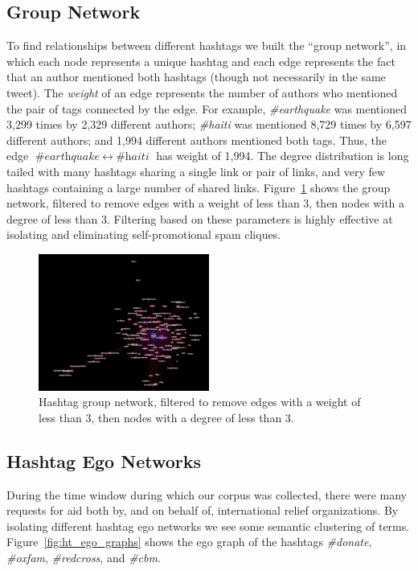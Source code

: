 \documentclass[a4paper, 11pt, titlepage]{article}
\begin{document}
\subsection{Group Network}

To find relationships between different hashtags we built the ``group network'', in which each node represents a unique hashtag and each edge represents the fact that an author mentioned both hashtags (though not necessarily in the same tweet). The \textit{weight} of an edge represents the number of authors who mentioned the pair of tags connected by the edge. For example, \textit{\#earthquake} was mentioned 3,299 times by 2,329 different authors; \textit{\#haiti} was mentioned 8,729 times by 6,597 different authors; and 1,994 different authors mentioned both tags. Thus, the edge $\textit{\#earthquake}~\leftrightarrow~\textit{\#haiti}$ has weight of 1,994. The degree distribution is long tailed with many hashtags sharing a single link or pair of links, and very few hashtags containing a large number of shared links. Figure~\ref{fig:ht_group_network} shows the group network, filtered to remove edges with a weight of less than 3, then nodes with a degree of less than 3. Filtering based on these parameters is highly effective at isolating and eliminating self-promotional spam cliques.

\begin{figure}[h]
\centering
\includegraphics[width=0.5\textwidth]{../figures/ht_group_network}
\caption{Hashtag group network, filtered to remove edges with a weight of less than 3, then nodes with a degree of less than 3. }
\label{fig:ht_group_network}
\end{figure}

\subsection{Hashtag Ego Networks}
During the time window during which our corpus was collected, there were many requests for aid both by, and on behalf of, international relief organizations. By isolating different hashtag ego networks we see some semantic clustering of terms. Figure~\ref{fig:ht_ego_graphs} shows the ego graph of the hashtags \textit{\#donate}, \textit{\#oxfam}, \textit{\#redcross}, and \textit{\#cbm}. 
\end{document}
